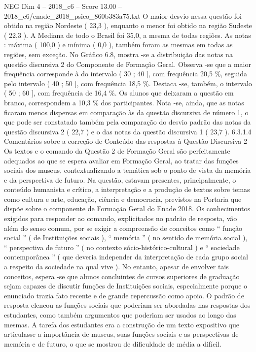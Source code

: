 \begin{textsample}{NEG Dim 4 – 2018\_c6 – Score 13.00 – 2018\_c6/enade\_2018\_psico\_860b383a75.txt}
O maior desvio nessa questão foi obtido na região Nordeste ( 23,3 ), enquanto o menor foi obtido na região Sudeste ( 22,3 ).
A Mediana de todo o Brasil foi 35,0, a mesma de todas regiões.
As notas : máxima ( 100,0 ) e mínima ( 0,0 ), também foram as mesmas em todas as regiões, sem exceção.
No Gráfico 6.8, mostra -se a distribuição das notas na questão discursiva 2 do Componente de Formação Geral.
Observa -se que a maior frequência corresponde à do intervalo ( 30 ; 40 ], com frequência 20,5 \%, seguida pelo intervalo ( 40 ; 50 ], com frequência 18,5 \%.
Destaca -se, também, o intervalo ( 50 ; 60 ], com frequência de 16,4 \%.
Os alunos que deixaram a questão em branco, correspondem a 10,3 \% dos participantes.
Nota -se, ainda, que as notas ficaram menos dispersas em comparação às da questão discursiva de número 1, o que pode ser constatado também pela comparação do desvio padrão das notas da questão discursiva 2 ( 22,7 ) e o das notas da questão discursiva 1 ( 23,7 ). 6.3.1.4 Comentários sobre a correção de Conteúdo das respostas à Questão Discursiva 2 Os textos e o comando da Questão 2 de Formação Geral são perfeitamente adequados ao que se espera avaliar em Formação Geral, ao tratar das funções sociais dos museus, contextualizando a temática sob o ponto de vista da memória e da perspectiva de futuro.
Na questão, estavam presentes, principalmente, o conteúdo humanista e crítico, a interpretação e a produção de textos sobre temas como cultura e arte, educação, ciência e democracia, previstos na Portaria que dispõe sobre o componente de Formação Geral do Enade 2018.
Os conhecimentos exigidos para responder ao comando, explicitados no padrão de resposta, vão além do senso comum, por se exigir a compreensão de conceitos como “ função social ” ( de Instituições sociais ), “ memória ” ( no sentido de memória social ), “ perspectiva de futuro ” ( no contexto sócio-histórico-cultural ) e “ sociedade contemporânea ” ( que deveria independer da interpretação de cada grupo social a respeito da sociedade na qual vive ).
No entanto, apesar de envolver tais conceitos, espera -se que alunos concluintes de cursos superiores de graduação sejam capazes de discutir funções de Instituições sociais, especialmente porque o enunciado trazia fato recente e de grande repercussão como apoio.
O padrão de resposta elencou as funções sociais que poderiam ser abordadas nas respostas dos estudantes, como também argumentos que poderiam ser usados ao longo das mesmas.
A tarefa dos estudantes era a construção de um texto expositivo que articulasse a importância de museus, suas funções sociais e as perspectivas de memória e de futuro, o que se mostrou de dificuldade de média a difícil.

\end{textsample}
